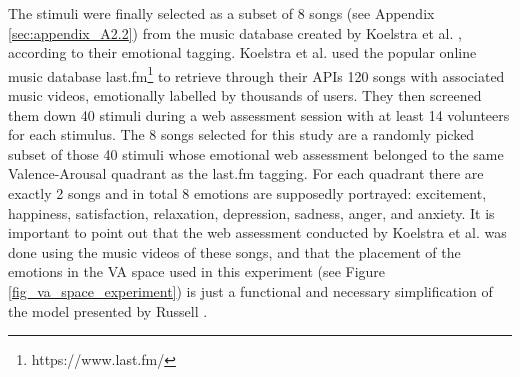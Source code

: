 The stimuli were finally selected as a subset of 8 songs (see Appendix \ref{sec:appendix_A2.2}) from the music database created by Koelstra et al. \cite{koelstra_deap_2012}, according to their emotional tagging. Koelstra et al. used the popular online music database last.fm\footnote{https://www.last.fm/}  to retrieve through their APIs 120 songs with associated music videos, emotionally labelled by thousands of users. They then screened them down 40 stimuli during a web assessment session with at least 14 volunteers for each stimulus. The 8 songs selected for this study are a randomly picked subset of those 40 stimuli whose emotional web assessment belonged to the same Valence-Arousal quadrant as the last.fm tagging. For each quadrant there are exactly 2 songs and in total 8 emotions are supposedly portrayed: excitement, happiness, satisfaction, relaxation, depression, sadness, anger, and anxiety. 
It is important to point out that the web assessment conducted by Koelstra et al. was done using the music videos of these songs, and that the placement of the emotions in the \ac{VA} space used in this experiment (see Figure \ref{fig_va_space_experiment}) is just a functional and necessary simplification of the model presented by Russell \cite{russell_circumplex_1980}.

